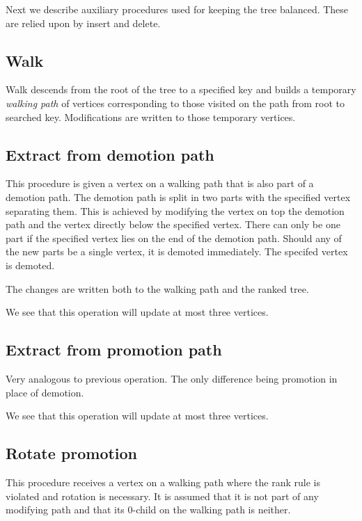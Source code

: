 Next we describe auxiliary procedures used for keeping the tree balanced. These are relied upon by insert and delete.

\subsection{Walk}

Walk descends from the root of the tree to a specified key and builds a temporary {\em walking path} of vertices corresponding to those visited on the path from root to searched key. Modifications are written to those temporary vertices.

\subsection{Extract from demotion path}

This procedure is given a vertex on a walking path that is also part of a demotion path. The demotion path is split in two parts with the specified vertex separating them. This is achieved by modifying the vertex on top the demotion path and the vertex directly below the specified vertex. There can only be one part if the specified vertex lies on the end of the demotion path. Should any of the new parts be a single vertex, it is demoted immediately. The specifed vertex is demoted.

The changes are written both to the walking path and the ranked tree.

We see that this operation will update at most three vertices.

\subsection{Extract from promotion path}

Very analogous to previous operation. The only difference being promotion in place of demotion.

We see that this operation will update at most three vertices.

\subsection{Rotate promotion}

This procedure receives a vertex on a walking path where the rank rule is violated and rotation is necessary. It is assumed that it is not part of any modifying path and that its $0$-child on the walking path is neither. 

